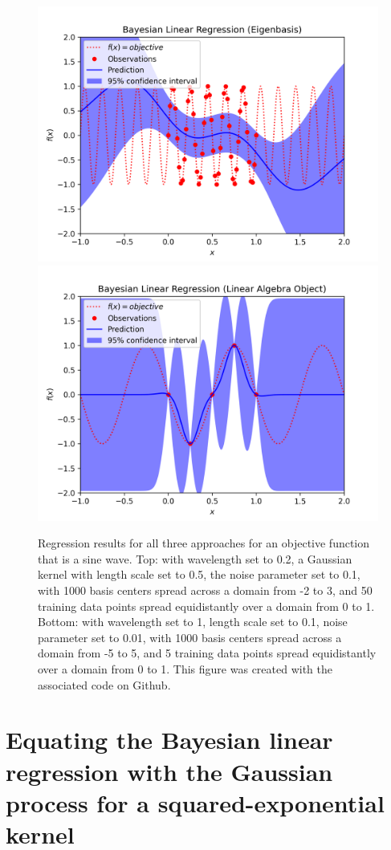 \documentclass{article}
\begin{document}
\begin{figure}
    \begin{center}
    \includegraphics[width=0.75\linewidth]{regression_results}
    \includegraphics[width=0.75\linewidth]{regression_results2}
    \caption{Regression results for all three approaches for an objective function that is a sine wave. Top: with wavelength set to 0.2, a Gaussian kernel with length scale set to 0.5, the noise parameter set to 0.1, with 1000 basis centers spread across a domain from -2 to 3, and 50 training data points spread equidistantly over a domain from 0 to 1. Bottom: with wavelength set to 1, length scale set to 0.1, noise parameter set to 0.01, with 1000 basis centers spread across a domain from -5 to 5, and 5 training data points spread equidistantly over a domain from 0 to 1. This figure was created with the associated code on Github.}
    \label{fig:example_regression}
    \end{center}
\end{figure}

\section{Equating the Bayesian linear regression with the Gaussian process for a squared-exponential kernel}
\end{document}
